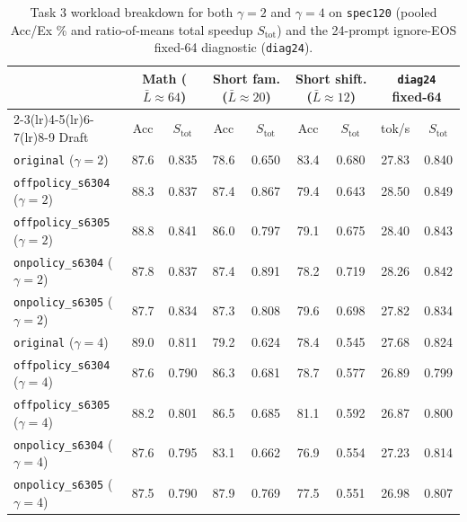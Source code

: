 \documentclass{article}
\begin{document}
\begin{table}[H]
\centering\footnotesize
\caption{Task 3 workload breakdown for both $\gamma=2$ and $\gamma=4$ on \texttt{spec120} (pooled Acc/Ex \% and ratio-of-means total speedup $S_{\text{tot}}$) and the 24-prompt ignore-EOS fixed-64 diagnostic (\texttt{diag24}).}
\label{tab:t3sub}
\begin{tabular}{lcccccccc}
\toprule
 & \multicolumn{2}{c}{Math ($\bar{L}\approx 64$)} & \multicolumn{2}{c}{Short fam. ($\bar{L}\approx 20$)} & \multicolumn{2}{c}{Short shift. ($\bar{L}\approx 12$)} & \multicolumn{2}{c}{\texttt{diag24} fixed-64} \\
\cmidrule(lr){2-3}\cmidrule(lr){4-5}\cmidrule(lr){6-7}\cmidrule(lr){8-9}
Draft & Acc & $S_{\text{tot}}$ & Acc & $S_{\text{tot}}$ & Acc & $S_{\text{tot}}$ & tok/s & $S_{\text{tot}}$ \\
\midrule
\texttt{original} ($\gamma=2$) & 87.6 & 0.835 & 78.6 & 0.650 & 83.4 & 0.680 & 27.83 & 0.840 \\
\texttt{offpolicy\_s6304} ($\gamma=2$) & 88.3 & 0.837 & 87.4 & 0.867 & 79.4 & 0.643 & 28.50 & 0.849 \\
\texttt{offpolicy\_s6305} ($\gamma=2$) & 88.8 & 0.841 & 86.0 & 0.797 & 79.1 & 0.675 & 28.40 & 0.843 \\
\texttt{onpolicy\_s6304} ($\gamma=2$) & 87.8 & 0.837 & 87.4 & 0.891 & 78.2 & 0.719 & 28.26 & 0.842 \\
\texttt{onpolicy\_s6305} ($\gamma=2$) & 87.7 & 0.834 & 87.3 & 0.808 & 79.6 & 0.698 & 27.82 & 0.834 \\
\midrule
\texttt{original} ($\gamma=4$) & 89.0 & 0.811 & 79.2 & 0.624 & 78.4 & 0.545 & 27.68 & 0.824 \\
\texttt{offpolicy\_s6304} ($\gamma=4$) & 87.6 & 0.790 & 86.3 & 0.681 & 78.7 & 0.577 & 26.89 & 0.799 \\
\texttt{offpolicy\_s6305} ($\gamma=4$) & 88.2 & 0.801 & 86.5 & 0.685 & 81.1 & 0.592 & 26.87 & 0.800 \\
\texttt{onpolicy\_s6304} ($\gamma=4$) & 87.6 & 0.795 & 83.1 & 0.662 & 76.9 & 0.554 & 27.23 & 0.814 \\
\texttt{onpolicy\_s6305} ($\gamma=4$) & 87.5 & 0.790 & 87.9 & 0.769 & 77.5 & 0.551 & 26.98 & 0.807 \\
\bottomrule
\end{tabular}
\end{table}
\end{document}
